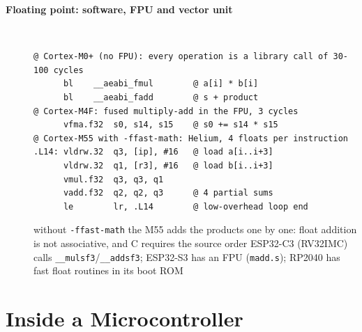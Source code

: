 \begin{description}
\item[{\rot\bf Floating point: software, FPU and vector unit}]~\\[-\lstskip]
\begin{lstlisting}[language={}]
@ Cortex-M0+ (no FPU): every operation is a library call of 30-100 cycles
      bl    __aeabi_fmul        @ a[i] * b[i]
      bl    __aeabi_fadd        @ s + product
@ Cortex-M4F: fused multiply-add in the FPU, 3 cycles
      vfma.f32  s0, s14, s15    @ s0 += s14 * s15
@ Cortex-M55 with -ffast-math: Helium, 4 floats per instruction
.L14: vldrw.32  q3, [ip], #16   @ load a[i..i+3]
      vldrw.32  q1, [r3], #16   @ load b[i..i+3]
      vmul.f32  q3, q3, q1
      vadd.f32  q2, q2, q3      @ 4 partial sums
      le        lr, .L14        @ low-overhead loop end
\end{lstlisting}
\bi
	\ite without \texttt{-ffast-math} the M55 adds the products one by one: float addition is not associative, and C requires the source order
	\ite ESP32-C3 (RV32IMC) calls \texttt{\_\_mulsf3}/\texttt{\_\_addsf3}; ESP32-S3 has an FPU (\texttt{madd.s}); RP2040 has fast float routines in its boot ROM
\ei
\os{\newpage}
\end{description}

\section{Inside a Microcontroller}

